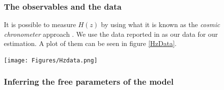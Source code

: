 \documentclass[onecolumn,           %
               showpacs,            %
               preprintnumbers,     %
               aps,                 %
               prl,          	    %
               letterpaper,             %
               superscriptaddress,      %
               nofootinbib,         %
               tightenlines,        %
               floats,floatfix      %
               ,usenatbib,
               ]{revtex4-1}
\begin{document}
%

\subsubsection{The observables and the data}

It is possible to measure $H(z)$ by using what it is known as the \textit{cosmic chronometer} approach \cite{Hz}. We use the data reported in \cite{Hzdata} as our data for our estimation. A plot of them can be seen in figure \ref{HzData}.

\begin{minipage}{\textwidth}
\centering
\texttt{[image: Figures/Hzdata.png]}
\label{HzData}
\end{minipage}

\subsubsection{Inferring the free parameters of the model}
\end{document}
